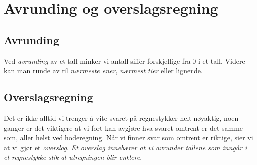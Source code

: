 \section{Avrunding og overslagsregning}

\subsection{Avrunding}
Ved \textit{avrunding} av et tall minker vi antall siffer forskjellige fra 0 i et tall. Videre kan man runde av til \textsl{nærmeste ener}, \textsl{nærmest tier} eller lignende.\regv
{}


\subsection{Overslagsregning}
Det er ikke alltid vi trenger å vite svaret på regnestykker helt nøyaktig, noen ganger er det viktigere at vi fort kan avgjøre hva svaret omtrent er det samme som, aller helst ved hoderegning. Når vi finner svar som omtrent er riktige, sier vi at vi gjør et \textit{overslag}. \textsl{Et overslag innebærer at vi avrunder tallene som inngår i et regnestykke slik at utregningen blir enklere}. \vsk

